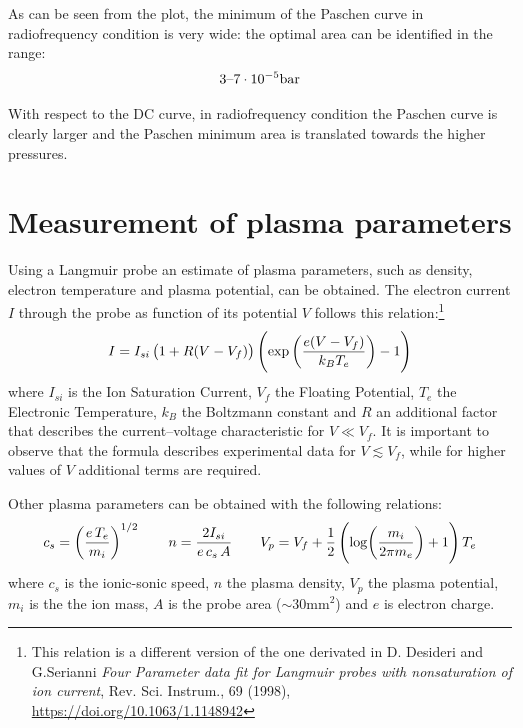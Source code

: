 \documentclass[11pt,a4 paper]{article}
\let\oldfrac\frac
\renewcommand{\frac}[3][d]{\ifthenelse{\equal{#1}{d}}{\oldfrac{#2}{#3}}{\nicefrac{#2}{#3}}}
\begin{document}

As can be seen from the plot, the minimum of the Paschen curve in radiofrequency condition is very wide: the optimal area can be identified in the range: $$3\textup{--}7 \cdot 10^{-5}\si{\bar}$$

With respect to the DC curve, in radiofrequency condition the Paschen curve is clearly larger and the Paschen minimum area is translated towards the higher pressures.

\section{Measurement of plasma parameters}
Using a Langmuir probe an estimate of plasma parameters, such as density, electron temperature and plasma potential, can be obtained.
The electron current $I$ through the probe as function of its potential $V$ follows this relation:\footnote{This relation is a different version of the one derivated in D. Desideri and G.Serianni \emph{Four Parameter data fit for Langmuir probes with nonsaturation of ion current}, Rev. Sci. Instrum., 69 (1998), \url{https://doi.org/10.1063/1.1148942}}
\[I=I_{si}\left(1+R(V-V_f)\right)\left(\exp\left(\frac{e(V-V_f)}{k_BT_e}\right)-1\right)\]
where $I_{si}$ is the Ion Saturation Current, $V_f$ the Floating Potential, $T_e$ the Electronic Temperature, $k_B$ the Boltzmann constant and $R$ an additional factor that describes the current--voltage characteristic for $V\ll V_f$.
It is important to observe that the formula describes experimental data for $V\lesssim V_f$, while for higher values of $V$ additional terms are required.

Other plasma parameters can be obtained with the following relations:
\begin{equation*}
  c_s=\left(\frac{e\,T_e}{m_i}\right)^{1/2} \qquad
  n=\frac{2I_{si}}{e\,c_s\,A} \qquad
  V_p=V_f+\frac12\left(\log(\frac{m_i}{2\pi m_e})+1\right) T_e
\end{equation*}
where $c_s$ is the ionic-sonic speed, $n$ the plasma density, $V_p$ the plasma potential, $m_i$ is the the ion mass, $A$ is the probe area ($\sim30\si{\milli\metre}^2$) and $e$ is electron charge.
\end{document}
